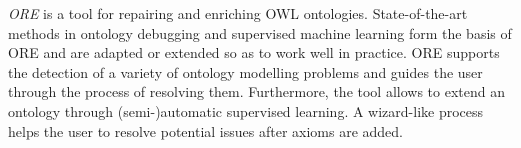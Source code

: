 \documentclass[a4paper, 11pt]{llncs}
\begin{document}
\emph{ORE} \cite{lehmann-2010-iswc} is a tool for repairing and enriching OWL ontologies.
State-of-the-art methods in ontology debugging and supervised machine learning form
the basis of ORE and are adapted or extended so as to work well in practice.
ORE supports the detection of a variety of ontology modelling problems and guides
the user through the process of resolving them.
Furthermore, the tool allows to extend an ontology through (semi-)automatic supervised learning.
A wizard-like process helps the user to resolve potential issues after axioms are added.





\enlargethispage{2mm}



\end{document}
